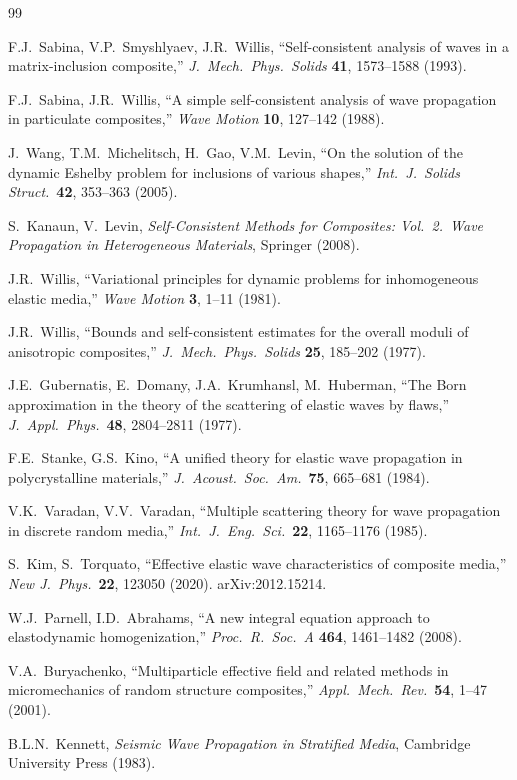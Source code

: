 \documentclass[11pt,a4paper]{article}
\begin{document}
\begin{thebibliography}{99}

F.J.\ Sabina, V.P.\ Smyshlyaev, J.R.\ Willis,
``Self-consistent analysis of waves in a matrix-inclusion composite,''
\emph{J.\ Mech.\ Phys.\ Solids} \textbf{41}, 1573--1588 (1993).

F.J.\ Sabina, J.R.\ Willis,
``A simple self-consistent analysis of wave propagation in particulate
composites,''
\emph{Wave Motion} \textbf{10}, 127--142 (1988).

J.\ Wang, T.M.\ Michelitsch, H.\ Gao, V.M.\ Levin,
``On the solution of the dynamic Eshelby problem for inclusions of
various shapes,''
\emph{Int.\ J.\ Solids Struct.}\ \textbf{42}, 353--363 (2005).

S.\ Kanaun, V.\ Levin,
\emph{Self-Consistent Methods for Composites: Vol.~2.\ Wave
Propagation in Heterogeneous Materials},
Springer (2008).

J.R.\ Willis,
``Variational principles for dynamic problems for inhomogeneous
elastic media,''
\emph{Wave Motion} \textbf{3}, 1--11 (1981).

J.R.\ Willis,
``Bounds and self-consistent estimates for the overall moduli of
anisotropic composites,''
\emph{J.\ Mech.\ Phys.\ Solids} \textbf{25}, 185--202 (1977).

J.E.\ Gubernatis, E.\ Domany, J.A.\ Krumhansl, M.\ Huberman,
``The Born approximation in the theory of the scattering of elastic
waves by flaws,''
\emph{J.\ Appl.\ Phys.}\ \textbf{48}, 2804--2811 (1977).

F.E.\ Stanke, G.S.\ Kino,
``A unified theory for elastic wave propagation in polycrystalline
materials,''
\emph{J.\ Acoust.\ Soc.\ Am.}\ \textbf{75}, 665--681 (1984).

V.K.\ Varadan, V.V.\ Varadan,
``Multiple scattering theory for wave propagation in discrete random
media,''
\emph{Int.\ J.\ Eng.\ Sci.}\ \textbf{22}, 1165--1176 (1985).

S.\ Kim, S.\ Torquato,
``Effective elastic wave characteristics of composite media,''
\emph{New J.\ Phys.}\ \textbf{22}, 123050 (2020).
arXiv:2012.15214.

W.J.\ Parnell, I.D.\ Abrahams,
``A new integral equation approach to elastodynamic homogenization,''
\emph{Proc.\ R.\ Soc.\ A} \textbf{464}, 1461--1482 (2008).

V.A.\ Buryachenko,
``Multiparticle effective field and related methods in micromechanics
of random structure composites,''
\emph{Appl.\ Mech.\ Rev.}\ \textbf{54}, 1--47 (2001).

B.L.N.\ Kennett,
\emph{Seismic Wave Propagation in Stratified Media},
Cambridge University Press (1983).

\end{thebibliography}
\end{document}

